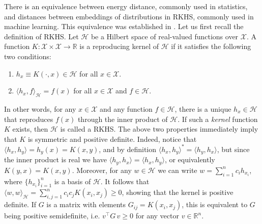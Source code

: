 \documentclass[aps,preprint,nofootinbib,floatfix]{revtex4-1}
\newcommand\kk{K}
\newcommand\kkk{h}
\newcommand\HH{\mathcal{H}}
\begin{document}
There is an equivalence between energy distance, 
commonly used in statistics,
and distances between embeddings of distributions in 
RKHS, commonly used in machine learning. 
This equivalence was established
in \cite{Sejdinovic2013}. Let us first recall the definition of
RKHS. Let $\HH$ be a Hilbert space of real-valued functions
over $\mathcal{X}$. A function 
$\kk : \mathcal{X} \times \mathcal{X} \to 
\mathbb{R}$ is a reproducing kernel of $\HH$ if it satisfies
the following two conditions:
\begin{enumerate}
\item $\kkk_x \equiv \kk(\cdot, x) \in \HH$ 
for all $x \in \mathcal{X}$.
\item $\langle \kkk_x, f \rangle_{\HH} = f(x)$ for
all $x\in\mathcal{X}$ and $f\in \HH$.
\end{enumerate}
In other words, for any $x \in \mathcal{X}$ and any function $f \in \HH$,
there is a unique 
$\kkk_x \in \HH$ that reproduces $f(x)$ through the inner product
of $\HH$.
If such a \emph{kernel} 
function $\kk$ exists, then $\HH$ is called a RKHS. The above two 
properties immediately imply that $\kk$ is symmetric and positive
definite. Indeed, notice that
$\langle \kkk_x, \kkk_y \rangle = \kkk_y(x) = \kk(x,y)$, and by definition
$\langle \kkk_x, \kkk_y \rangle^* = \langle \kkk_y, \kkk_x \rangle$, but
since the inner product is real we have 
$\langle \kkk_y, \kkk_x \rangle = \langle \kkk_x, \kkk_y \rangle$, or
equivalently 
$\kk(y,x) = \kk(x,y)$. Moreover, for any $w \in
\HH$ we can write $w = \sum_{i=1}^n c_i \kkk_{x_i}$, where
$\{ \kkk_{x_i} \}_{i=1}^n$ is a basis of $\HH$. It follows that
$\langle w, w \rangle_{\HH}  = \sum_{i,j=1}^n c_i c_j \kk(x_i,x_j) \ge 0$,
showing that the kernel is positive definite. If $G$ is a matrix with
elements $G_{ij} = \kk(x_i,x_j)$, this is equivalent to $G$ being
positive semidefinite, i.e. $v^\top G \, v \ge 0$ for any vector
$v \in \mathbb{R}^n$.
\end{document}
